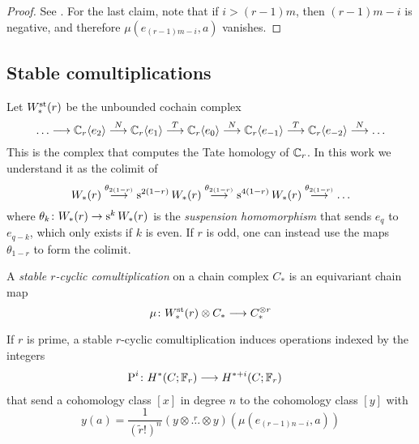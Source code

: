 \begin{proof} See \cite{may1970general}.    %
	For the last claim, note that if $i>(r-1)m$, then $(r-1)m-i$ is negative, and therefore $\mu(e_{(r-1)m-i},a)$ vanishes.
\end{proof}

\subsection{Stable comultiplications}

Let $W^{\mathrm{st}}_*(r)$ be the unbounded cochain complex
\[
\ldots\longrightarrow \mathbb{C}_r\langle e_2\rangle \overset{N}{\longrightarrow}
\mathbb{C}_r\langle e_1\rangle \overset{T}{\longrightarrow}
\mathbb{C}_r\langle e_0\rangle \overset{N}{\longrightarrow}
\mathbb{C}_r\langle e_{-1}\rangle \overset{T}{\longrightarrow}
\mathbb{C}_r\langle e_{-2}\rangle \overset{N}{\longrightarrow}
\ldots
\]
This is the complex that computes the Tate homology of $\mathbb{C}_r$. In this work we understand it as the colimit of
\[
W_*(r)\overset{\theta_{2(1-r)}}{\longrightarrow} \operatorname{s}^{2(1-r)} W_*(r) \overset{\theta_{2(1-r)}}{\longrightarrow} \operatorname{s}^{4(1-r)} W_*(r) \overset{\theta_{2(1-r)}}{\longrightarrow} \ldots
\]
where $\theta_{k}\colon W_*(r)\to \operatorname{s}^{k} W_*(r)$ is the \emph{suspension homomorphism} that sends $e_{q}$ to $e_{q-k}$, which only exists if $k$ is even. If $r$ is odd, one can instead use the maps $\theta_{1-r}$ to form the colimit.

A \emph{stable $r$-cyclic comultiplication} on a chain complex $C_*$ is an equivariant chain map
\[
\mu\colon W_*^{\mathrm{st}}(r)\otimes C_*\longrightarrow C_*^{\otimes r}
\]
\begin{proposition}
	If $r$ is prime, a stable $r$-cyclic comultiplication induces operations indexed by the integers
	\begin{align*}
		\operatorname{P}^{i}\colon H^*(C;\mathbb{F}_r)&\longrightarrow H^{*+i}(C;\mathbb{F}_r)
	\end{align*}
	that send a cohomology class $[x]$ in degree $n$ to the cohomology class $[y]$ with
	\[
	y(a) = \frac{1}{(\tilde{r}!)^n}(y\otimes \overset{r}{\ldots}\otimes y)(\mu(e_{(r-1)n-i},a))
	\]
\end{proposition}

